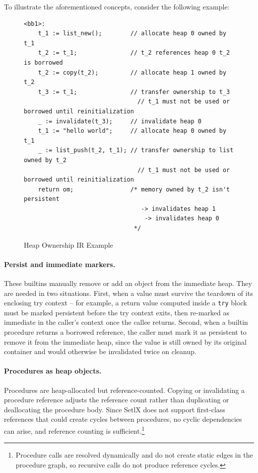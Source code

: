 To illustrate the aforementioned concepts, consider the following example:

\begin{figure}[H]
\begin{lstlisting}
<bb1>:
    t_1 := list_new();        // allocate heap 0 owned by t_1
    t_2 := t_1;               // t_2 references heap 0 t_2 is borrowed
    t_2 := copy(t_2);         // allocate heap 1 owned by t_2
    t_3 := t_1;               // transfer ownership to t_3
                                // t_1 must not be used or borrowed until reinitialization
    _ := invalidate(t_3);     // invalidate heap 0
    t_1 := "hello world";     // allocate heap 0 owned by t_1
    _ := list_push(t_2, t_1); // transfer ownership to list owned by t_2
                                // t_1 must not be used or borrowed until reinitialization
    return om;                /* memory owned by t_2 isn't persistent
                                 -> invalidates heap 1
                                  -> invalidates heap 0
                               */
\end{lstlisting}
\caption{Heap Ownership \ac{IR} Example}
\end{figure}
\FloatBarrier

\paragraph{Persist and immediate markers.}
These builtins manually remove or add an object from the immediate heap. They are needed in two situations. First, when a value must survive the teardown of its enclosing try context -- for example, a return value computed inside a \texttt{try} block must be marked persistent before the try context exits, then re-marked as immediate in the caller's context once the callee returns. Second, when a builtin procedure returns a borrowed reference, the caller must mark it as persistent to remove it from the immediate heap, since the value is still owned by its original container and would otherwise be invalidated twice on cleanup.

\paragraph{Procedures as heap objects.}
Procedures are heap-allocated but reference-counted. Copying or invalidating a procedure reference adjusts the reference count rather than duplicating or deallocating the procedure body. Since SetlX does not support first-class references that could create cycles between procedures, no cyclic dependencies can arise, and reference counting is sufficient.\footnote{Procedure calls are resolved dynamically and do not create static edges in the procedure graph, so recursive calls do not produce reference cycles.}

